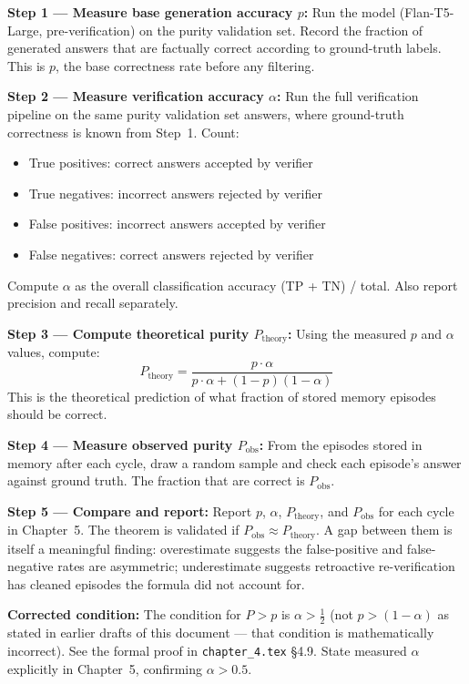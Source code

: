 \documentclass[12pt,a4paper]{article}
\theoremstyle{definition}
\begin{document}
\begin{designbox}
\textbf{Step 1 — Measure base generation accuracy $p$:}
Run the model (Flan-T5-Large, pre-verification) on the purity validation set. Record the fraction of generated answers that are factually correct according to ground-truth labels. This is $p$, the base correctness rate before any filtering.

\textbf{Step 2 — Measure verification accuracy $\alpha$:}
Run the full verification pipeline on the same purity validation set answers, where ground-truth correctness is known from Step~1. Count:
\begin{itemize}
    \item True positives: correct answers accepted by verifier
    \item True negatives: incorrect answers rejected by verifier
    \item False positives: incorrect answers accepted by verifier
    \item False negatives: correct answers rejected by verifier
\end{itemize}
Compute $\alpha$ as the overall classification accuracy (TP + TN) / total. Also report precision and recall separately.

\textbf{Step 3 — Compute theoretical purity $P_{\text{theory}}$:}
Using the measured $p$ and $\alpha$ values, compute:
\[
P_{\text{theory}} = \frac{p \cdot \alpha}{p \cdot \alpha + (1-p)(1-\alpha)}
\]
This is the theoretical prediction of what fraction of stored memory episodes should be correct.

\textbf{Step 4 — Measure observed purity $P_{\text{obs}}$:}
From the episodes stored in memory after each cycle, draw a random sample and check each episode's answer against ground truth. The fraction that are correct is $P_{\text{obs}}$.

\textbf{Step 5 — Compare and report:}
Report $p$, $\alpha$, $P_{\text{theory}}$, and $P_{\text{obs}}$ for each cycle in Chapter~5. The theorem is validated if $P_{\text{obs}} \approx P_{\text{theory}}$. A gap between them is itself a meaningful finding: overestimate suggests the false-positive and false-negative rates are asymmetric; underestimate suggests retroactive re-verification has cleaned episodes the formula did not account for.

\textbf{Corrected condition:} The condition for $P > p$ is $\alpha > \frac{1}{2}$ (not $p > (1-\alpha)$ as stated in earlier drafts of this document --- that condition is mathematically incorrect). See the formal proof in \texttt{chapter\_4.tex} §4.9. State measured $\alpha$ explicitly in Chapter~5, confirming $\alpha > 0.5$.
\end{designbox}
\end{document}
